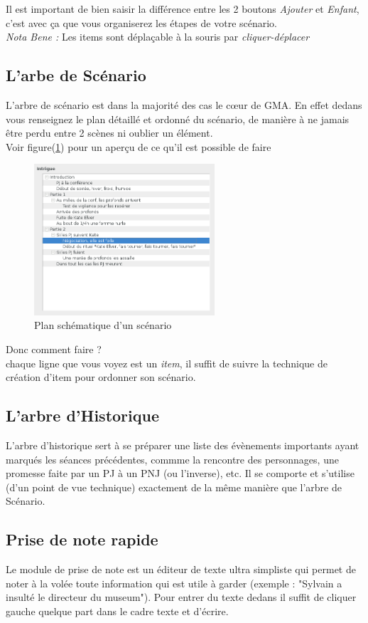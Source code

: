 \documentclass[a4paper,12pt]{article}
\begin{document}
Il est important de bien saisir la différence entre les 2 boutons \emph{Ajouter} et \emph{Enfant}, c'est avec ça que vous organiserez les étapes de votre scénario.
\\
\emph{Nota Bene :} Les items sont déplaçable à la souris par \emph{cliquer-déplacer}

\subsection{L'arbe de Scénario}\label{scenario}
L'arbre de scénario est dans la majorité des cas le cœur de GMA. En effet dedans vous renseignez le plan détaillé et ordonné du scénario, de manière à ne jamais être perdu entre 2 scènes ni oublier un élément.
\\
Voir figure(\ref{arbre_scenar}) pour un aperçu de ce qu'il est possible de faire
\begin{figure}[h]
    \includegraphics[width=0.6\textwidth]{scenario_type}
    \caption{Plan schématique d'un scénario}
    \label{arbre_scenar}
\end{figure}
Donc comment faire ?
\\
chaque ligne que vous voyez est un \emph{item}, il suffit de suivre la technique de création d'item pour ordonner son scénario.
\subsection{L'arbre d'Historique}\label{historique}
L'arbre d'historique sert à se préparer une liste des évènements importants ayant marqués les séances précédentes, commme la rencontre des personnages, une promesse faite par un PJ à un PNJ (ou l'inverse), etc.
Il se comporte et s'utilise (d'un point de vue technique) exactement de la même manière que l'arbre de Scénario.


\subsection{Prise de note rapide}
Le module de prise de note est un éditeur de texte ultra simpliste qui permet de noter à la volée toute information qui est utile à garder (exemple : "Sylvain a insulté le directeur du museum"). Pour entrer du texte dedans il suffit de cliquer gauche quelque part dans le cadre texte et d'écrire.
\\
\end{document}

